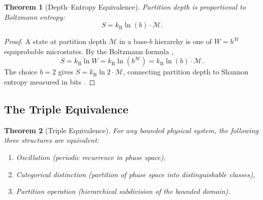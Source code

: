 \documentclass[twocolumn,10pt,a4paper]{article}
\newtheorem{theorem}{Theorem}[section]
\theoremstyle{definition}
\theoremstyle{remark}
\newcommand{\kB}{k_{\mathrm{B}}}
\newcommand{\Depth}{\mathcal{M}}
\begin{document}
\begin{theorem}[Depth--Entropy Equivalence]
\label{thm:depth_entropy}
Partition depth is proportional to Boltzmann entropy:
\begin{equation}
    S = \kB \ln(b) \cdot \Depth.
\end{equation}
\end{theorem}

\begin{proof}
A state at partition depth $\Depth$ in a base-$b$ hierarchy is one of $W = b^{\Depth}$ equiprobable microstates. By the Boltzmann formula \citep{Boltzmann1877},
\begin{equation}
    S = \kB \ln W = \kB \ln(b^{\Depth}) = \kB \ln(b) \cdot \Depth.
\end{equation}
The choice $b = 2$ gives $S = \kB \ln 2 \cdot \Depth$, connecting partition depth to Shannon entropy measured in bits \citep{Shannon1948}.
\end{proof}

\subsection{The Triple Equivalence}

\begin{theorem}[Triple Equivalence]
\label{thm:triple}
For any bounded physical system, the following three structures are equivalent:
\begin{enumerate}[label=(\roman*)]
    \item Oscillation (periodic recurrence in phase space),
    \item Categorical distinction (partition of phase space into distinguishable classes),
    \item Partition operation (hierarchical subdivision of the bounded domain).
\end{enumerate}
\end{theorem}
\end{document}
